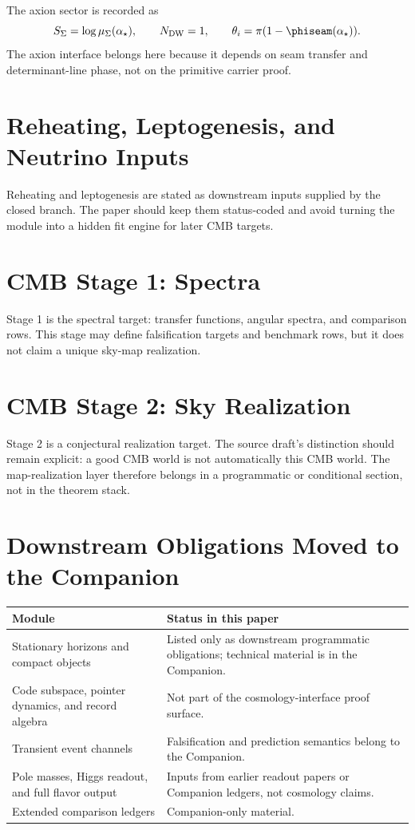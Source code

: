 The axion sector is recorded as
\[
S_\Sigma=\log\mu_\Sigma(\alpha_\star),
\qquad
N_{\mathrm{DW}}=1,
\qquad
\theta_i=\pi(1-\phiseam(\alpha_\star)).
\]
The axion interface belongs here because it depends on seam transfer and determinant-line phase,
not on the primitive carrier proof.

\section{Reheating, Leptogenesis, and Neutrino Inputs}

Reheating and leptogenesis are stated as downstream inputs supplied by the closed branch. The paper
should keep them status-coded and avoid turning the module into a hidden fit engine for later CMB
targets.

\section{CMB Stage 1: Spectra}

Stage 1 is the spectral target: transfer functions, angular spectra, and comparison rows. This
stage may define falsification targets and benchmark rows, but it does not claim a unique sky-map
realization.

\section{CMB Stage 2: Sky Realization}

Stage 2 is a conjectural realization target. The source draft's distinction should remain explicit:
a good CMB world is not automatically this CMB world. The map-realization layer therefore belongs
in a programmatic or conditional section, not in the theorem stack.

\section{Downstream Obligations Moved to the Companion}

\begin{center}
\begin{tabularx}{\textwidth}{@{}p{}Y@{}}
\toprule
\textbf{Module} & \textbf{Status in this paper} \\
\midrule
Stationary horizons and compact objects & Listed only as downstream programmatic obligations; technical material is in the Companion. \\
Code subspace, pointer dynamics, and record algebra & Not part of the cosmology-interface proof surface. \\
Transient event channels & Falsification and prediction semantics belong to the Companion. \\
Pole masses, Higgs readout, and full flavor output & Inputs from earlier readout papers or Companion ledgers, not cosmology claims. \\
Extended comparison ledgers & Companion-only material. \\
\bottomrule
\end{tabularx}
\end{center}

